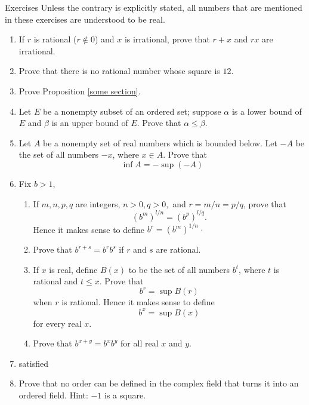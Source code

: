 \begin{xcb}{Exercises}
  \noindent Unless the contrary is explicitly stated, all numbers that are mentioned in these exercises are understood to be real.
  \begin{enumerate}
    \item  If $r$ is rational ($r \notin 0$) and $x$ is irrational, prove that $r + x$ and $rx$ are irrational.
    \item Prove that there is no rational number whose square is $12$.
    \item Prove Proposition \ref{some section}.
    \item  Let $E$ be a nonempty subset of an ordered set; suppose $\alpha$ is a lower bound of $E$ and $\beta$ 
    is an upper bound of $E$. Prove that $\alpha \leq \beta$.
    \item Let $A$ be a nonempty set of real numbers which is bounded below. Let $-A$ be the set of all numbers 
    $-x$, where $x \in A$. Prove that
    \begin{equation*}
      \inf A = -\sup (-A)
    \end{equation*}
    \item Fix $b>1$,
    \begin{enumerate}
      \item If $m,n,p,q$ are integers, $n>0,q>0,$ and $r=m/n=p/q$, prove that
      \begin{equation*}
        (b^m)^{l/n} =(b^p)^{l/q}.
      \end{equation*}
      Hence it makes sense to define $b^r = (b^m)^{1/n}$·
      \item Prove that $b^{r+s}= b^rb^s$ if $r$ and $s$ are rational.
      \item If $x$ is real, define $B(x)$ to be the set of all numbers $b^t$, where $t$ is rational and $t \leq x$. Prove that
      \begin{equation*}
        b^r = \sup B(r)
      \end{equation*}
      when $r$ is rational. Hence it makes sense to define
      \begin{equation*}
        b^x = \sup B(x)
      \end{equation*}
      for every real $x$.
      \item Prove that $b^{x+y} = b^xb^y$ for all real $x$ and $y$.
    \end{enumerate}
    \item satisfied
    \item Prove that no order can be defined in the complex field that turns it into an ordered field. Hint: $-1$ is a square.

\end{enumerate}
\end{xcb}
